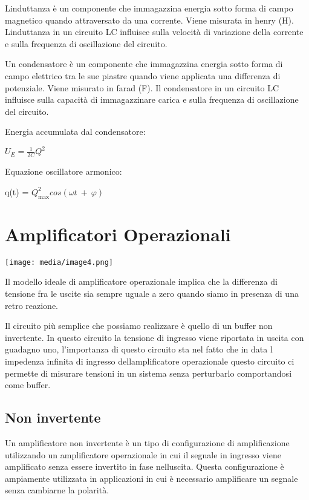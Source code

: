 L\textquotesingle induttanza è un componente che immagazzina energia
sotto forma di campo magnetico quando attraversato da una corrente.
Viene misurata in henry (H). L\textquotesingle induttanza in un circuito
LC influisce sulla velocità di variazione della corrente e sulla
frequenza di oscillazione del circuito.

Un condensatore è un componente che immagazzina energia sotto forma di
campo elettrico tra le sue piastre quando viene applicata una differenza
di potenziale. Viene misurato in farad (F). Il condensatore in un
circuito LC influisce sulla capacità di immagazzinare carica e sulla
frequenza di oscillazione del circuito.

Energia accumulata dal condensatore:

\(U_{E} = \frac{1}{2C}Q^{2}\)

Equazione oscillatore armonico:

q(t) = \(Q_{\max}^{2}cos(\omega t\  + \ \varphi)\)\(\)

\section{Amplificatori Operazionali}\label{amplificatori-operazionali}

\texttt{[image: media/image4.png]}

Il modello ideale di amplificatore operazionale implica che la
differenza di tensione fra le uscite sia sempre uguale a zero quando
siamo in presenza di una retro reazione.

Il circuito più semplice che possiamo realizzare è quello di un buffer
non invertente. In questo circuito la tensione di ingresso viene
riportata in uscita con guadagno uno, l'importanza di questo circuito
sta nel fatto che in data l\textquotesingle{} impedenza infinita di
ingresso dell\textquotesingle amplificatore operazionale questo circuito
ci permette di misurare tensioni in un sistema senza perturbarlo
comportandosi come buffer.

\subsection{Non invertente}\label{non-invertente}

Un amplificatore non invertente è un tipo di configurazione di
amplificazione utilizzando un amplificatore operazionale in cui il
segnale in ingresso viene amplificato senza essere invertito in fase
nell\textquotesingle uscita. Questa configurazione è ampiamente
utilizzata in applicazioni in cui è necessario amplificare un segnale
senza cambiarne la polarità.

